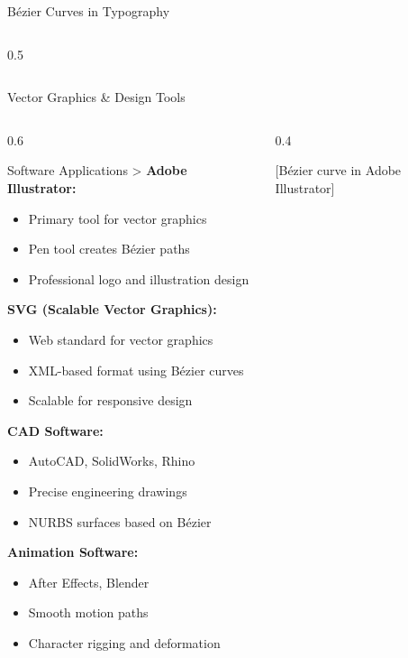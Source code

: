 \begin{frame}{Bézier Curves in Typography}
\begin{columns}
\begin{column}{0.5\textwidth}
\begin{center}
      \end{center}
    \end{column}
  \end{columns}
\end{frame}

\begin{frame}{Vector Graphics \& Design Tools}
  \begin{columns}
    \begin{column}{0.6\textwidth}
      \begin{conceptbox}{Software Applications}
        \scriptsize>
        \textbf{Adobe Illustrator:}
        \begin{itemize}
          \item Primary tool for vector graphics
          \item Pen tool creates Bézier paths
          \item Professional logo and illustration design
        \end{itemize}

        \textbf{SVG (Scalable Vector Graphics):}
        \begin{itemize}
          \item Web standard for vector graphics
          \item XML-based format using Bézier curves
          \item Scalable for responsive design
        \end{itemize}

        \textbf{CAD Software:}
        \begin{itemize}
          \item AutoCAD, SolidWorks, Rhino
          \item Precise engineering drawings
          \item NURBS surfaces based on Bézier
        \end{itemize}

        \textbf{Animation Software:}
        \begin{itemize}
          \item After Effects, Blender
          \item Smooth motion paths
          \item Character rigging and deformation
        \end{itemize}
      \end{conceptbox}
    \end{column}
    \begin{column}{0.4\textwidth}
      \begin{center}
        \textcolor{AccentColor}{[Bézier curve in Adobe Illustrator]}


\end{center}
\end{column}
\end{columns}
\end{frame}
